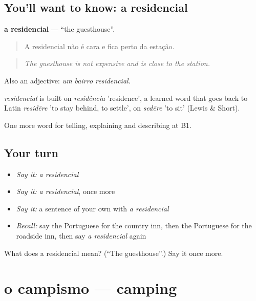 \subsection*{You'll want to know: a residencial}
\textbf{a residencial} — \textquotedblleft{}the guesthouse\textquotedblright{}.

\begin{quote}
A residencial não é cara e fica perto da estação.
\end{quote}

\begin{quote}
\emph{The guesthouse is not expensive and is close to the station.}
\end{quote}

Also an adjective: \emph{um bairro residencial}.

\begin{cousinweb}
\emph{residencial} is built on \emph{residência} 'residence', a learned word that goes back to Latin \emph{residēre} 'to stay behind, to settle', on \emph{sedēre} 'to sit' (Lewis \& Short).
\end{cousinweb}

\begin{grammarlens}[title={What you've built}]
One more word for telling, explaining and describing at B1.
\end{grammarlens}

\subsection*{Your turn}
\begin{itemize}
\raggedright
  \item \emph{Say it:} \emph{a residencial}
  \item \emph{Say it:} \emph{a residencial}, once more
  \item \emph{Say it:} a sentence of your own with \emph{a residencial}
  \item \emph{Recall:} say the Portuguese for the country inn, then the Portuguese for the roadside inn, then say \emph{a residencial} again
\end{itemize}

\begin{tcolorbox}[breakable,colback=teal!4,colframe=teal!35!black,title={Before you move on}]
What does a residencial mean? (\textquotedblleft{}The guesthouse\textquotedblright{}.) Say it once more.
\end{tcolorbox}
\section[o campismo]{o campismo — camping}

